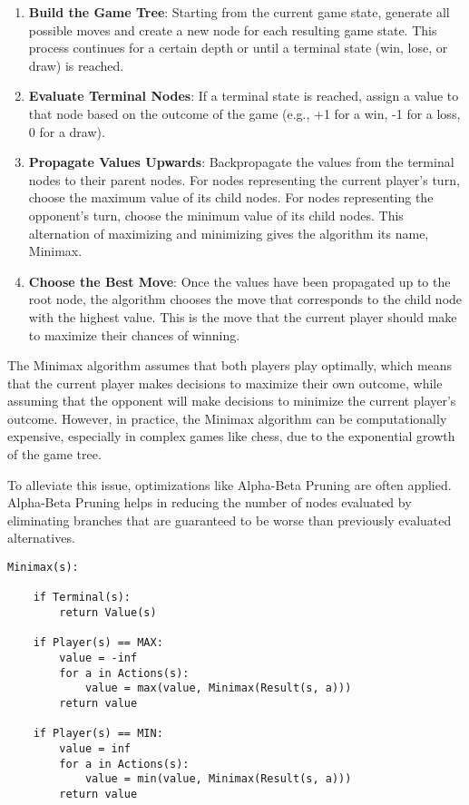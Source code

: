 \documentclass{article}
\begin{document}
\begin{enumerate}
    \item \textbf{Build the Game Tree}: Starting from the current game state, generate all possible moves and create a new node for each resulting game state. This process continues for a certain depth or until a terminal state (win, lose, or draw) is reached.
    \item \textbf{Evaluate Terminal Nodes}: If a terminal state is reached, assign a value to that node based on the outcome of the game (e.g., +1 for a win, -1 for a loss, 0 for a draw).
    \item \textbf{Propagate Values Upwards}: Backpropagate the values from the terminal nodes to their parent nodes. For nodes representing the current player's turn, choose the maximum value of its child nodes. For nodes representing the opponent's turn, choose the minimum value of its child nodes. This alternation of maximizing and minimizing gives the algorithm its name, Minimax.
    \item \textbf{Choose the Best Move}: Once the values have been propagated up to the root node, the algorithm chooses the move that corresponds to the child node with the highest value. This is the move that the current player should make to maximize their chances of winning.
\end{enumerate}

The Minimax algorithm assumes that both players play optimally, which means that the current player makes decisions to maximize their own outcome, while assuming that the opponent will make decisions to minimize the current player's outcome. However, in practice, the Minimax algorithm can be computationally expensive, especially in complex games like chess, due to the exponential growth of the game tree.

To alleviate this issue, optimizations like Alpha-Beta Pruning are often applied. Alpha-Beta Pruning helps in reducing the number of nodes evaluated by eliminating branches that are guaranteed to be worse than previously evaluated alternatives.

\newpage

\begin{lstlisting}
Minimax(s):

    if Terminal(s):
        return Value(s)

    if Player(s) == MAX:
        value = -inf
        for a in Actions(s):
            value = max(value, Minimax(Result(s, a)))
        return value

    if Player(s) == MIN:
        value = inf
        for a in Actions(s):
            value = min(value, Minimax(Result(s, a)))
        return value 
\end{lstlisting}
\end{document}
